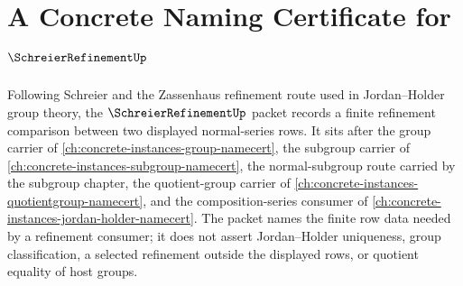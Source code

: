 \chapter{A Concrete Naming Certificate for $\SchreierRefinementUp$}
\label{ch:concrete-instances-schreier-refinement-namecert}

Following Schreier and the Zassenhaus refinement route used in Jordan--Holder group theory, the $\SchreierRefinementUp$ packet records a finite refinement comparison between two displayed normal-series rows. It sits after the group carrier of \autoref{ch:concrete-instances-group-namecert}, the subgroup carrier of \autoref{ch:concrete-instances-subgroup-namecert}, the normal-subgroup route carried by the subgroup chapter, the quotient-group carrier of \autoref{ch:concrete-instances-quotientgroup-namecert}, and the composition-series consumer of \autoref{ch:concrete-instances-jordan-holder-namecert}. The packet names the finite row data needed by a refinement consumer; it does not assert Jordan--Holder uniqueness, group classification, a selected refinement outside the displayed rows, or quotient equality of host groups.

